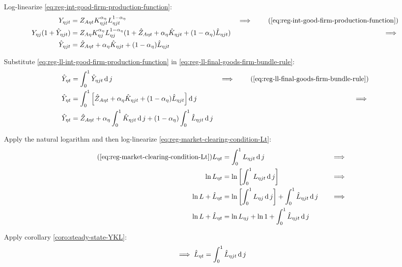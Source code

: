 \documentclass[
thesis.tex
]{subfiles}
\begin{document}
Log-linearize \ref{eq:reg-int-good-firm-production-function}:
\begin{alignat}{2}
	Y_{\eta jt} &= Z_{A\eta t} K_{\eta jt}^{\alpha_{\eta}} L_{\eta jt}^{1-{\alpha_{\eta}}} &\implies \tag{\ref{eq:reg-int-good-firm-production-function}} \\
	Y_{\eta j} (1+ \hat{Y}_{\eta jt}) &= Z_{A\eta} K_{\eta j}^{\alpha_{\eta}} L_{\eta j}^{1-{\alpha_{\eta}}} (1+ \hat{Z}_{A\eta t} + {\alpha_{\eta}} \hat{K}_{\eta jt} + (1-{\alpha_{\eta}}) \hat{L}_{\eta jt}) &\implies \nonumber \\
	\hat{Y}_{\eta jt} &= \hat{Z}_{A\eta t} + {\alpha_{\eta}} \hat{K}_{\eta jt} + (1-{\alpha_{\eta}}) \hat{L}_{\eta jt} \label{eq:reg-ll-int-good-firm-production-function}
\end{alignat}

Substitute \ref{eq:reg-ll-int-good-firm-production-function} in \ref{eq:reg-ll-final-goods-firm-bundle-rule}:
\begin{alignat}{2}
	\hat{Y}_{\eta t} &= \int_{0}^{1} \hat{Y}_{\eta jt} \dif j &\implies \tag{\ref{eq:reg-ll-final-goods-firm-bundle-rule}} \\
	\hat{Y}_{\eta t} &= \int_{0}^{1} \left[ \hat{Z}_{A\eta t} + {\alpha_{\eta}} \hat{K}_{\eta jt} + (1-{\alpha_{\eta}}) \hat{L}_{\eta jt} \right] \dif j &\implies \nonumber \\
	\hat{Y}_{\eta t} &= \hat{Z}_{A\eta t} + {\alpha_{\eta}} \int_{0}^{1} \hat{K}_{\eta jt} \dif j + (1-{\alpha_{\eta}}) \int_{0}^{1} \hat{L}_{\eta jt} \dif j \label{eq:reg-ll-final-goods-firm-bundle-rule-2}
\end{alignat}

Apply the natural logarithm and then log-linearize \ref{eq:reg-market-clearing-condition-Lt}:
\begin{alignat}{2}
	\tag{\ref{eq:reg-market-clearing-condition-Lt}}
	L_{\eta t} &= \int_{0}^{1} L_{\eta jt} \dif j &\implies \\
	\ln L_{\eta t} &= \ln \left[ \int_{0}^{1} L_{\eta jt} \dif j \right] &\implies \nonumber \\
	\ln L + \hat{L}_{\eta t} &= \ln \left[ \int_{0}^{1} L_{\eta j} \dif j \right] + \int_{0}^{1} \hat{L}_{\eta jt} \dif j \quad &\implies \nonumber \\
	\ln L + \hat{L}_{\eta t} &= \ln L_{\eta j} + \ln 1 + \int_{0}^{1} \hat{L}_{\eta jt} \dif j \nonumber
\end{alignat}

Apply corollary \ref{coro:steady-state-YKL}:
\begin{align}
	\implies \hat{L}_{\eta t} &= \int_{0}^{1} \hat{L}_{\eta jt} \operatorname{d} j \label{eq:reg-ll-market-clearing-condition-Lt}
\end{align}
\end{document}
